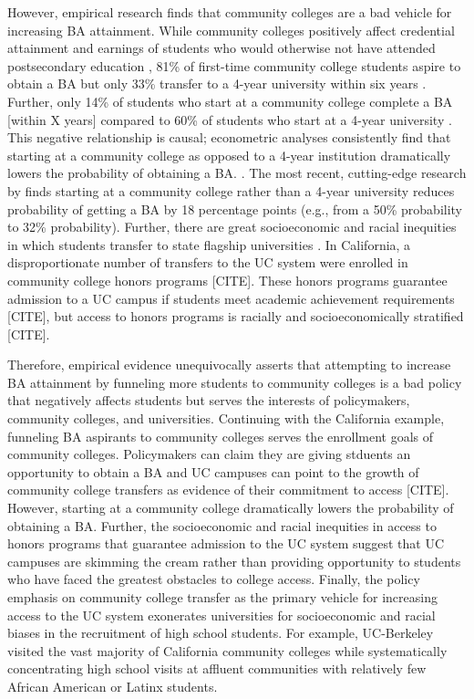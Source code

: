 \documentclass[twoside]{article}
\begin{document}
However, empirical research finds that community colleges are a bad vehicle for increasing BA attainment. While community colleges positively affect credential attainment and earnings of students who would otherwise not have attended postsecondary education \citep[e.g., ][]{RN4404}, 81\% of first-time community college students aspire to obtain a BA but only 33\% transfer to a 4-year university within six years \citep{RN4406}. Further, only 14\% of students who start at a community college complete a BA [within X years] compared to 60\% of students who start at a 4-year university \citep{RN4406}.  This negative relationship is causal; econometric analyses consistently find that starting at a community college as opposed to a 4-year institution dramatically lowers the probability of obtaining a BA. \citep[e.g., ][]{RN4284,RN2261,RN4292,RN4405}. The most recent, cutting-edge research by \cite{RN4404} finds starting at a community college rather than a 4-year university reduces probability of getting a BA by 18 percentage points (e.g., from a 50\% probability to 32\% probability).  Further, there are great socioeconomic and racial inequities in which students transfer to state flagship universities \citep{RN1492}. In California, a disproportionate number of transfers to the UC system were enrolled in community college honors programs [CITE]. These honors programs guarantee admission to a UC campus if students meet academic achievement requirements [CITE], but access to honors programs is racially and socioeconomically stratified [CITE].

Therefore, empirical evidence unequivocally asserts that attempting to increase BA attainment by funneling more students to community colleges is a bad policy that negatively affects students but serves the interests of policymakers, community colleges, and universities.  Continuing with the California example, funneling BA aspirants to community colleges serves the enrollment goals of community colleges. Policymakers can claim they are giving stduents an opportunity to obtain a BA and UC campuses can point to the growth of community college transfers as evidence of their commitment to access [CITE].  However, starting at a community college dramatically lowers the probability of obtaining a BA.  Further, the socioeconomic and racial inequities in access to honors programs that guarantee admission to the UC system suggest that UC campuses are skimming the cream rather than providing opportunity to students who have faced the greatest obstacles to college access. Finally, the policy emphasis on community college transfer as the primary vehicle for increasing access to the UC system exonerates universities for socioeconomic and racial biases in the recruitment of high school students.  For example, UC-Berkeley visited the vast majority of California community colleges while systematically concentrating high school visits at affluent communities with relatively few African American or Latinx students.
\end{document}
